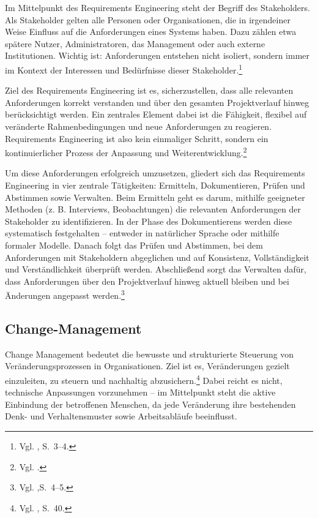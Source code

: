 \documentclass[
    12pt, 
    a4paper,
    ]{scrartcl} %
\begin{document}
Im Mittelpunkt des Requirements Engineering steht der Begriff des Stakeholders. Als Stakeholder gelten alle Personen oder Organisationen, die in irgendeiner Weise Einfluss auf die Anforderungen eines Systems haben. Dazu zählen etwa spätere Nutzer, Administratoren, das Management oder auch externe Institutionen. Wichtig ist: Anforderungen entstehen nicht isoliert, sondern immer im Kontext der Interessen und Bedürfnisse dieser Stakeholder.\footnote{Vgl. \cite{S_PohlRupp}, S.~3--4.}

Ziel des Requirements Engineering ist es, sicherzustellen, dass alle relevanten Anforderungen korrekt verstanden und über den gesamten Projektverlauf hinweg berücksichtigt werden. Ein zentrales Element dabei ist die Fähigkeit, flexibel auf veränderte Rahmenbedingungen und neue Anforderungen zu reagieren. Requirements Engineering ist also kein einmaliger Schritt, sondern ein kontinuierlicher Prozess der Anpassung und Weiterentwicklung.\footnote{Vgl. \cite{S_ISR}.} 

Um diese Anforderungen erfolgreich umzusetzen, gliedert sich das Requirements Engineering in vier zentrale Tätigkeiten: Ermitteln, Dokumentieren, Prüfen und Abstimmen sowie Verwalten. Beim Ermitteln geht es darum, mithilfe geeigneter Methoden (z. B. Interviews, Beobachtungen) die relevanten Anforderungen der Stakeholder zu identifizieren. In der Phase des Dokumentierens werden diese systematisch festgehalten – entweder in natürlicher Sprache oder mithilfe formaler Modelle. Danach folgt das Prüfen und Abstimmen, bei dem Anforderungen mit Stakeholdern abgeglichen und auf Konsistenz, Vollständigkeit und Verständlichkeit überprüft werden. Abschließend sorgt das Verwalten dafür, dass Anforderungen über den Projektverlauf hinweg aktuell bleiben und bei Änderungen angepasst werden.\footnote{Vgl. \cite{S_PohlRupp},S.~4--5.}

\subsection{Change-Management}

Change Management bedeutet die bewusste und strukturierte Steuerung von Veränderungsprozessen in Organisationen. Ziel ist es, Veränderungen gezielt einzuleiten, zu steuern und nachhaltig abzusichern.\footnote{Vgl. \cite{S_Schichtel}, S.~40.} Dabei reicht es nicht, technische Anpassungen vorzunehmen – im Mittelpunkt steht die aktive Einbindung der betroffenen Menschen, da jede Veränderung ihre bestehenden Denk- und Verhaltensmuster sowie Arbeitsabläufe beeinflusst.
\end{document}
